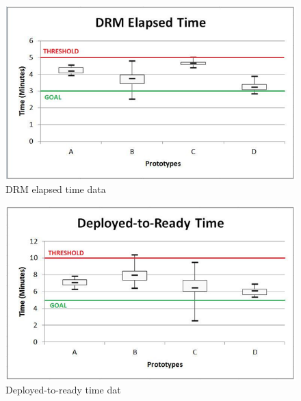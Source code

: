 \documentclass[letterpaper,10pt]{article}
\begin{document}
\begin{figure}[h!tbp]
	\begin{center}
		\includegraphics[scale=0.65]{images/drmElapsedTime.png}
	\end{center}
	\caption{DRM elapsed time data}
	\label{fig:drmElapsedTime}
\end{figure}

\begin{figure}[h!tbp]
	\begin{center}
		\includegraphics[scale=0.65]{images/deployedToReadyTime.png}
	\end{center}
	\caption{Deployed-to-ready time dat}
	\label{fig:deployedToReadyTime}
\end{figure}
\pagebreak
\end{document}
